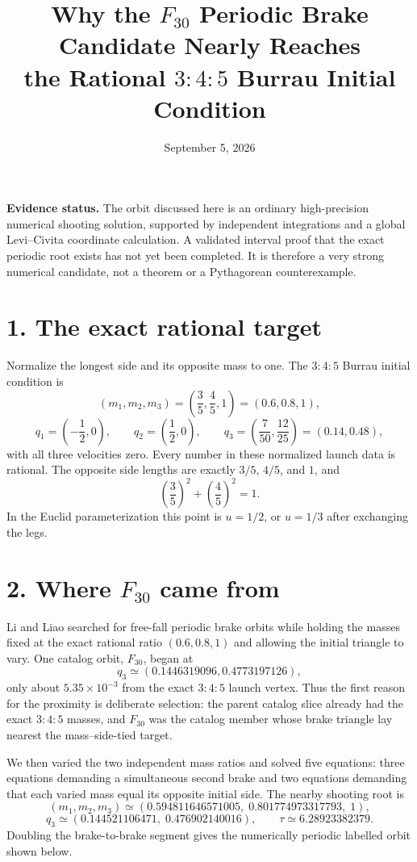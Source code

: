 \documentclass[11pt]{article}
\title{Why the $F_{30}$ Periodic Brake Candidate Nearly Reaches\\
the Rational $3{:}4{:}5$ Burrau Initial Condition}
\author{}
\date{September 5, 2026}
\begin{document}
\maketitle

\noindent
\textbf{Evidence status.}
The orbit discussed here is an ordinary high-precision numerical shooting
solution, supported by independent integrations and a global Levi--Civita
coordinate calculation.  A validated interval proof that the exact periodic
root exists has not yet been completed.  It is therefore a very strong
numerical candidate, not a theorem or a Pythagorean counterexample.

\section*{1. The exact rational target}

Normalize the longest side and its opposite mass to one.  The $3{:}4{:}5$
Burrau initial condition is
\[
 (m_1,m_2,m_3)=\left(\frac35,\frac45,1\right)
                 =(0.6,0.8,1),
\]
\[
 q_1=\left(-\frac12,0\right),\qquad
 q_2=\left( \frac12,0\right),\qquad
 q_3=\left(\frac{7}{50},\frac{12}{25}\right)=(0.14,0.48),
\]
with all three velocities zero.  Every number in these normalized launch data
is rational.  The opposite side lengths are exactly $3/5$, $4/5$, and $1$,
and
\[
 \left(\frac35\right)^2+\left(\frac45\right)^2=1.
\]
In the Euclid parameterization this point is $u=1/2$, or $u=1/3$ after
exchanging the legs.

\section*{2. Where $F_{30}$ came from}

Li and Liao searched for free-fall periodic brake orbits while holding the
masses fixed at the exact rational ratio $(0.6,0.8,1)$ and allowing the
initial triangle to vary.  One catalog orbit, $F_{30}$, began at
\[
 q_3\simeq(0.1446319096,0.4773197126),
\]
only about $5.35\times10^{-3}$ from the exact $3{:}4{:}5$ launch vertex.
Thus the first reason for the proximity is deliberate selection: the parent
catalog slice already had the exact $3{:}4{:}5$ masses, and $F_{30}$ was the
catalog member whose brake triangle lay nearest the mass--side-tied target.

We then varied the two independent mass ratios and solved five equations:
three equations demanding a simultaneous second brake and two equations
demanding that each varied mass equal its opposite initial side.  The nearby
shooting root is
\[
 (m_1,m_2,m_3)\simeq
 (0.594811646571005,\;0.801774973317793,\;1),
\]
\[
 q_3\simeq(0.144521106471,\;0.476902140016),
 \qquad \tau\simeq6.28923382379.
\]
Doubling the brake-to-brake segment gives the numerically periodic labelled
orbit shown below.
\end{document}
